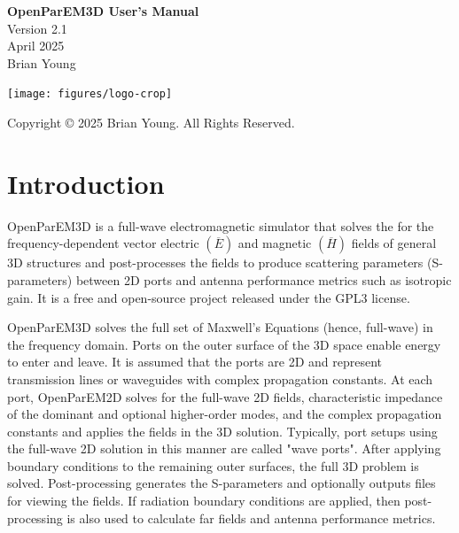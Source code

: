 \documentclass[titlepage]{article}
\renewcommand\_{\textunderscore\linebreak[1]}
\begin{document}
\begin{titlepage}

   \centering
   \vspace*{3cm}
   {\huge\bfseries OpenParEM3D User's Manual} \\
   \vskip1cm
   {\Large Version 2.1} \\
   \vskip1cm
   {\Large April 2025} \\
   \vskip1cm
   {\Large Brian Young} \\

   \vfill

   \texttt{[image: figures/logo-crop]}

   \vspace*{\fill}
   Copyright \copyright{} 2025 Brian Young. All Rights Reserved.
\end{titlepage}

\tableofcontents

\newpage
\section{Introduction}

OpenParEM3D is a full-wave electromagnetic simulator that solves the for the frequency-dependent vector electric $(\overline{E})$ and magnetic $(\overline{H})$ fields of general 3D structures and post-processes the fields to produce scattering parameters (S-parameters) between 2D ports and antenna performance metrics such as isotropic gain.  It is a free and open-source project released under the GPL3 license.

OpenParEM3D solves the full set of Maxwell's Equations (hence, full-wave) in the frequency domain.  Ports on the outer surface of the 3D space enable energy to enter and leave.  It is assumed that the ports are 2D and represent transmission lines or waveguides with complex propagation constants.  At each port, OpenParEM2D solves for the full-wave 2D fields, characteristic impedance of the dominant and optional higher-order modes, and the complex propagation constants and applies the fields in the 3D solution.  Typically, port setups using the full-wave 2D solution in this manner are called "wave ports".  After applying boundary conditions to the remaining outer surfaces, the full 3D problem is solved.  Post-processing generates the S-parameters and optionally outputs files for viewing the fields.  If radiation boundary conditions are applied, then post-processing is also used to calculate far fields and antenna performance metrics. 
\end{document}
